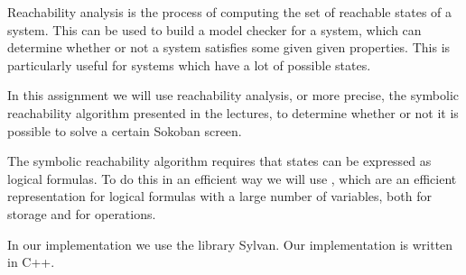 Reachability analysis is the process of computing the set of reachable states 
of a system. This can be used to build a model checker for a system, which can
determine whether or not a system satisfies some given given properties. This
is particularly useful for systems which have a lot of possible states.

In this assignment we will use reachability analysis, or more precise, the 
symbolic reachability algorithm presented in the lectures, to determine whether
or not it is possible to solve a certain Sokoban screen.

The symbolic reachability algorithm requires that states can be expressed as
logical formulas. To do this in an efficient way we will use \robdds, which 
are an efficient representation for logical formulas with a large number of
variables, both for storage and for operations.

In our implementation we use the \robdd library Sylvan. Our implementation
is written in C++.